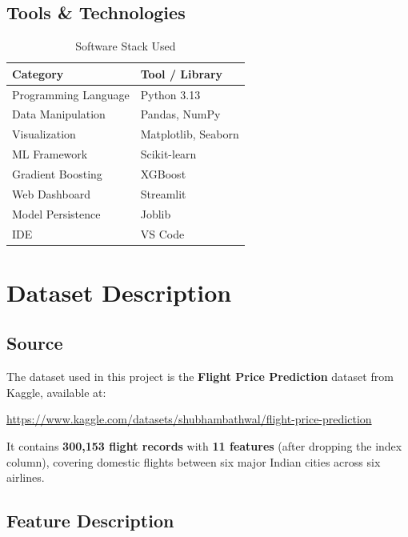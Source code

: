 \documentclass[12pt, a4paper]{article}
\begin{document}
\subsection{Tools \& Technologies}

\begin{table}[H]
\centering
\caption{Software Stack Used}
\begin{tabular}{ll}
\toprule
\textbf{Category} & \textbf{Tool / Library} \\
\midrule
Programming Language & Python 3.13 \\
Data Manipulation    & Pandas, NumPy \\
Visualization        & Matplotlib, Seaborn \\
ML Framework         & Scikit-learn \\
Gradient Boosting    & XGBoost \\
Web Dashboard        & Streamlit \\
Model Persistence    & Joblib \\
IDE                  & VS Code \\
\bottomrule
\end{tabular}
\end{table}

\newpage

\section{Dataset Description}

\subsection{Source}

The dataset used in this project is the \textbf{Flight Price Prediction} dataset from Kaggle, available at:

\url{https://www.kaggle.com/datasets/shubhambathwal/flight-price-prediction}

It contains \textbf{300,153 flight records} with \textbf{11 features} (after dropping the index column), covering domestic flights between six major Indian cities across six airlines.

\subsection{Feature Description}
\end{document}
